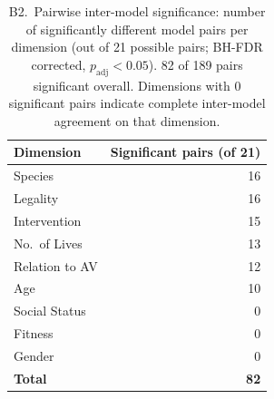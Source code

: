 \documentclass[11pt,letterpaper]{article}
\begin{document}
\begin{landscape}
\begin{table}[H]
\caption{B2.\ Pairwise inter-model significance: number of significantly different model pairs
per dimension (out of 21 possible pairs; BH-FDR corrected, $p_{\mathrm{adj}}<0.05$).
82 of 189 pairs significant overall.
Dimensions with 0 significant pairs indicate complete inter-model agreement on that dimension.}
\label{tab:sig_pairwise}
\centering
\begin{tabular}{lr}
\toprule
\textbf{Dimension} & \textbf{Significant pairs (of 21)} \\
\midrule
Species        & 16 \\
Legality       & 16 \\
Intervention   & 15 \\
No.\ of Lives  & 13 \\
Relation to AV & 12 \\
Age            & 10 \\
Social Status  & \phantom{0}0 \\
Fitness        & \phantom{0}0 \\
Gender         & \phantom{0}0 \\
\midrule
\textbf{Total} & \textbf{82} \\
\bottomrule
\end{tabular}
\end{table}



\end{landscape}
\end{document}
